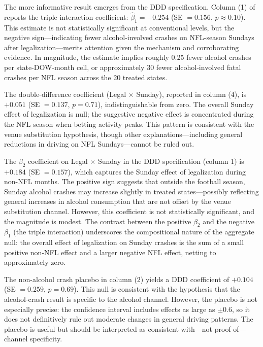 \documentclass[12pt]{article}
\begin{document}
The more informative result emerges from the DDD specification. Column (1) of  reports the triple interaction coefficient: $\hat{\beta}_1 = -0.254$ (SE $= 0.156$, $p \approx 0.10$). This estimate is not statistically significant at conventional levels, but the negative sign---indicating fewer alcohol-involved crashes on NFL-season Sundays after legalization---merits attention given the mechanism and corroborating evidence. In magnitude, the estimate implies roughly 0.25 fewer alcohol crashes per state-DOW-month cell, or approximately 30 fewer alcohol-involved fatal crashes per NFL season across the 20 treated states.

The double-difference coefficient (Legal $\times$ Sunday), reported in column (4), is $+0.051$ (SE $= 0.137$, $p = 0.71$), indistinguishable from zero. The overall Sunday effect of legalization is null; the suggestive negative effect is concentrated during the NFL season when betting activity peaks. This pattern is consistent with the venue substitution hypothesis, though other explanations---including general reductions in driving on NFL Sundays---cannot be ruled out.

The $\beta_2$ coefficient on Legal $\times$ Sunday in the DDD specification (column 1) is $+0.184$ (SE $= 0.157$), which captures the Sunday effect of legalization during non-NFL months. The positive sign suggests that outside the football season, Sunday alcohol crashes may increase slightly in treated states---possibly reflecting general increases in alcohol consumption that are not offset by the venue substitution channel. However, this coefficient is not statistically significant, and the magnitude is modest. The contrast between the positive $\beta_2$ and the negative $\beta_1$ (the triple interaction) underscores the compositional nature of the aggregate null: the overall effect of legalization on Sunday crashes is the sum of a small positive non-NFL effect and a larger negative NFL effect, netting to approximately zero.

The non-alcohol crash placebo in column (2) yields a DDD coefficient of $+0.104$ (SE $= 0.259$, $p = 0.69$). This null is consistent with the hypothesis that the alcohol-crash result is specific to the alcohol channel. However, the placebo is not especially precise: the confidence interval includes effects as large as $\pm 0.6$, so it does not definitively rule out moderate changes in general driving patterns. The placebo is useful but should be interpreted as consistent with---not proof of---channel specificity.
\end{document}
